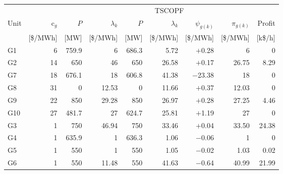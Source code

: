 \begin{table}[!tb]
\centering
\label{tab:prices_39bus_gfm}
\footnotesize
\setlength{\tabcolsep}{2pt}
\newcommand{\rowhl}[1]{\cellcolor{gray!25}#1}
\begin{tabular}{lr>{\hspace{5pt}}rr>{\hspace{5pt}}rrrrr}
\toprule
 & & \multicolumn{2}{c}{\acs{ACOPF}} & \multicolumn{5}{c}{\acs{TSCOPF}} \\
\cmidrule(lr){3-4}\cmidrule(lr){5-9}
Unit & $\mathrm{c}_g$ & $P$ & $\lambda_k$ & $P$ & $\lambda_k$ & $\psi_{g(k)}$ & $\pi_{g(k)}$ & Profit \\
 & {\scriptsize [\$/MWh]} & {\scriptsize [MW]} & {\scriptsize [\$/MWh]} & {\scriptsize [MW]} & {\scriptsize [\$/MWh]} & {\scriptsize [\$/MWh]} & {\scriptsize [\$/MWh]} & {\scriptsize [k\$/h]} \\
\midrule
G1 & 6 & 759.9 & 6 & 686.3 & 5.72 & $+$0.28 & 6 & 0 \\
G2 & 14 & 650 & 46 & 650 & 26.58 & $+$0.17 & 26.75 & 8.29 \\
\rowhl{G7} & \rowhl{18} & \rowhl{676.1} & \rowhl{18} & \rowhl{606.8} & \rowhl{41.38} & \rowhl{$-$23.38} & \rowhl{18} & \rowhl{0} \\
G8 & 31 & 0 & 12.53 & 0 & 11.66 & $+$0.37 & 12.03 & 0 \\
G9 & 22 & 850 & 29.28 & 850 & 26.97 & $+$0.28 & 27.25 & 4.46 \\
G10 & 27 & 481.7 & 27 & 624.7 & 25.81 & $+$1.19 & 27 & 0 \\
\midrule
G3 & 1 & 750 & 46.94 & 750 & 33.46 & $+$0.04 & 33.50 & 24.38 \\
G4 & 1 & 635.9 & 1 & 636.3 & 1.06 & $-$0.06 & 1 & 0 \\
G5 & 1 & 550 & 1 & 550 & 1.05 & $-$0.02 & 1.03 & 0.02 \\
\rowhl{G6} & \rowhl{1} & \rowhl{550} & \rowhl{11.48} & \rowhl{550} & \rowhl{41.63} & \rowhl{$-$0.64} & \rowhl{40.99} & \rowhl{21.99} \\
\bottomrule
\end{tabular}
\end{table}
